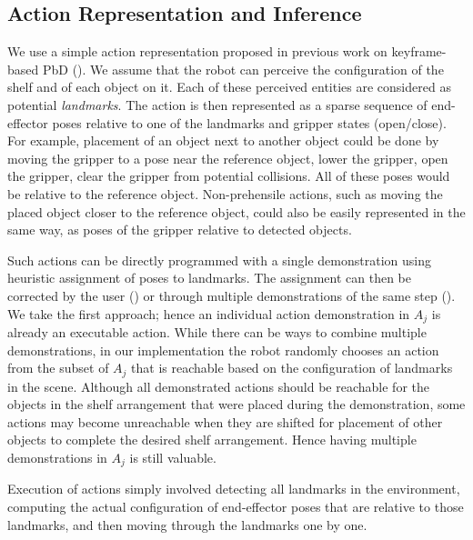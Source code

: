 \subsection{Action Representation and Inference}
\label{sec:irosactions}

We use a simple action representation proposed in previous work on keyframe-based PbD (\cite{akgun2012keyframe,alexandrova2014robot}).
We assume that the robot can perceive the configuration of the shelf and of each object on it.
Each of these perceived entities are considered as potential {\em landmarks}.
The action is then represented as a sparse sequence of end-effector poses relative to one of the landmarks and gripper states (open/close).
For example, placement of an object next to another object could be done by moving the gripper to a pose near the reference object, lower the gripper, open the gripper, clear the gripper from potential collisions. All of these poses would be relative to the reference object. Non-prehensile actions, such as moving the placed object closer to the reference object, could also be easily represented in the same way, as poses of the gripper relative to detected objects.

Such actions can be directly programmed with a single demonstration using heuristic assignment of poses to landmarks.
The assignment can then be corrected by the user (\cite{alexandrova2014robot}) or through multiple demonstrations of the same step (\cite{niekum2012learning}).
We take the first approach; hence an individual action demonstration in $A_j$ is already an executable action.
While there can be ways to combine multiple demonstrations, in our implementation the robot randomly chooses an action from the subset of $A_j$ that is reachable based on the configuration of landmarks in the scene.
Although all demonstrated actions should be reachable for the objects in the shelf arrangement that were placed during the demonstration, some actions may become unreachable when they are shifted for placement of other objects to complete the desired shelf arrangement.
Hence having multiple demonstrations in $A_j$ is still valuable.

Execution of actions simply involved detecting all landmarks in the environment, computing the actual configuration of end-effector poses that are relative to those landmarks, and then moving through the landmarks one by one.

